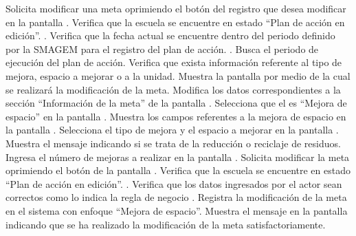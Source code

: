  
\begin{UCtrayectoria}
	\UCpaso[\UCactor] Solicita modificar una meta oprimiendo el botón \botEdit del registro que desea modificar en la pantalla . 
	\UCpaso[\UCsist] Verifica que la escuela se encuentre en  estado ``Plan de acción en edición''. .
	\UCpaso[\UCsist] Verifica que la fecha actual se encuentre dentro del periodo definido por la SMAGEM para el registro del plan de acción. .	
	\UCpaso[\UCsist] Busca el periodo de ejecución del plan de acción.
	\UCpaso[\UCsist] Verifica que exista información referente al tipo de mejora, espacio a mejorar o a la unidad. 
	\UCpaso[\UCsist] Muestra la pantalla  por medio de la cual se realizará la modificación de la meta.
	\UCpaso[\UCactor] Modifica los datos correspondientes a la sección ``Información de la meta'' de la pantalla . \label{cupae2:ingresaDatos}
	\UCpaso[\UCactor] Selecciona que el  es ``Mejora de espacio'' en la pantalla . 
	\UCpaso[\UCsist] Muestra los campos referentes a la mejora de espacio en la pantalla .
	\UCpaso[\UCactor] Selecciona el tipo de mejora y el espacio a mejorar en la pantalla .
	\UCpaso[\UCsist] Muestra el mensaje  indicando si se trata de la reducción o reciclaje de residuos.
	\UCpaso[\UCactor] Ingresa el número de mejoras a realizar en la pantalla .
	\UCpaso[\UCactor] Solicita modificar la meta oprimiendo el botón  de la pantalla . 
	\UCpaso[\UCsist] Verifica que la escuela se encuentre en  estado ``Plan de acción en edición''. .
	\UCpaso[\UCsist] Verifica que los datos ingresados por el actor sean correctos como lo indica la regla de negocio .   
	\UCpaso[\UCsist] Registra la modificación de la meta en el sistema con enfoque ``Mejora de espacio''.
	\UCpaso[\UCsist] Muestra el mensaje  en la pantalla  indicando que se ha realizado la modificación de la meta satisfactoriamente. \label{cupae2:muestraMensaje}
\end{UCtrayectoria}
 
